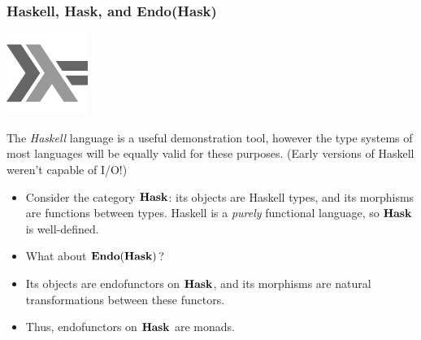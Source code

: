 \documentclass{beamer}
\numberwithin{figure}{section}
\DeclareMathOperator{\catendo}{\text{\textbf{Endo}}}
\DeclareMathOperator{\cathask}{\text{\textbf{Hask}}}
\begin{document}
\begin{frame}
        \frametitle{Haskell, \textbf{Hask}, and \textbf{Endo}(\textbf{Hask})}
        \begin{center}
                \begin{minipage}{.2\textwidth}
                        \includegraphics{hasklogo.pdf}
                \end{minipage}
                \begin{minipage}{.7\textwidth}
                        The \textit{Haskell} language is a useful demonstration
                        tool, however the type systems of most languages will be
                        equally valid for these purposes. (Early versions of
                        Haskell weren't capable of I/O!)
                \end{minipage}
        \end{center}
        \pause
        \begin{itemize}
                \item Consider the category $\cathask$: its objects are Haskell
                        types, and its morphisms are functions between types.
                        Haskell is a \textit{purely} functional language, so
                        $\cathask$ is well-defined.
                \item What about $\catendo(\cathask)$?
                \item Its objects are endofunctors on $\cathask$, and its
                        morphisms are natural transformations between these
                        functors.
                \item Thus, endofunctors on $\cathask$ are monads.
        \end{itemize}
\end{frame}
\end{document}
